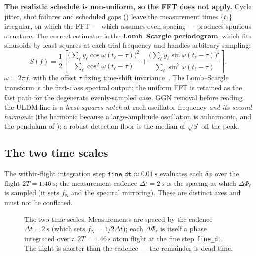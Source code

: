 \documentclass[11pt,a4paper]{article}
\theoremstyle{reqstyle}
\begin{document}
\textbf{The realistic schedule is non-uniform, so the FFT does not apply.} Cycle jitter,
shot failures and scheduled gaps () leave the measurement times
$\{t_\ell\}$ irregular, on which the FFT --- which assumes even spacing --- produces spurious
structure. The correct estimator is the \textbf{Lomb--Scargle periodogram}, which fits
sinusoids by least squares at each trial frequency and handles arbitrary sampling:
\begin{equation}
S(f) = \frac{1}{2}\!\left[
\frac{\big(\sum_\ell y_\ell\cos\omega(t_\ell-\tau)\big)^2}{\sum_\ell\cos^2\omega(t_\ell-\tau)}
+\frac{\big(\sum_\ell y_\ell\sin\omega(t_\ell-\tau)\big)^2}{\sum_\ell\sin^2\omega(t_\ell-\tau)}
\right],
\end{equation}
$\omega = 2\pi f$, with the offset $\tau$ fixing time-shift invariance~\cite{scargle1982}. The
Lomb--Scargle transform is the first-class spectral output; the uniform FFT is retained as the
fast path for the degenerate evenly-sampled case. GGN removal before reading the ULDM line is a
\emph{least-squares notch} at each oscillator frequency \emph{and its second harmonic} (the
harmonic because a large-amplitude oscillation is anharmonic,  and the pendulum
of ); a robust detection floor is the median of $\sqrt{S}$ off the peak.

\subsection{The two time scales}
The within-flight integration step $\texttt{fine\_dt}\approx\SI{0.01}{\second}$ evaluates
each $\delta\phi$ over the flight $2T = \SI{1.46}{\second}$; the measurement cadence
$\Delta t = \SI{2}{\second}$ is the spacing at which $\Delta\Phi_\ell$ is sampled (it sets
$f_{\mathrm N}$ and the spectral mirroring). These are distinct axes and must not be
conflated.

\begin{figure}[h]
\centering
{}
\caption{The two time scales. Measurements are spaced by the cadence
$\Delta t=\SI{2}{\second}$ (which sets $f_{\mathrm N}=1/2\Delta t$); each $\Delta\Phi_\ell$ is
itself a phase integrated over a $2T=\SI{1.46}{\second}$ atom flight at the fine step
\texttt{fine\_dt}. The flight is shorter than the cadence --- the remainder is dead time.}
\label{fig:timescales}
\end{figure}
\end{document}
